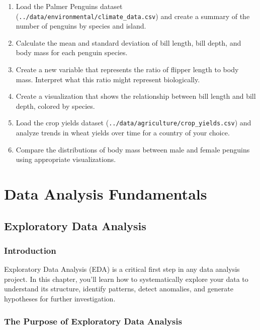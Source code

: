 \documentclass[
  letterpaper,
]{book}
\providecommand{\tightlist}{%
  \setlength{\itemsep}{0pt}\setlength{\parskip}{0pt}}
\begin{document}
\begin{enumerate}
\def\labelenumi{\arabic{enumi}.}
\tightlist
\item
  Load the Palmer Penguins dataset
  (\texttt{../data/environmental/climate\_data.csv}) and create a
  summary of the number of penguins by species and island.
\item
  Calculate the mean and standard deviation of bill length, bill depth,
  and body mass for each penguin species.
\item
  Create a new variable that represents the ratio of flipper length to
  body mass. Interpret what this ratio might represent biologically.
\item
  Create a visualization that shows the relationship between bill length
  and bill depth, colored by species.
\item
  Load the crop yields dataset
  (\texttt{../data/agriculture/crop\_yields.csv}) and analyze trends in
  wheat yields over time for a country of your choice.
\item
  Compare the distributions of body mass between male and female
  penguins using appropriate visualizations.
\end{enumerate}

\part{Data Analysis Fundamentals}

\chapter{Exploratory Data Analysis}\label{exploratory-data-analysis-1}

\section{Introduction}\label{introduction-1}

Exploratory Data Analysis (EDA) is a critical first step in any data
analysis project. In this chapter, you'll learn how to systematically
explore your data to understand its structure, identify patterns, detect
anomalies, and generate hypotheses for further investigation.

\section{The Purpose of Exploratory Data
Analysis}\label{the-purpose-of-exploratory-data-analysis}
\end{document}
